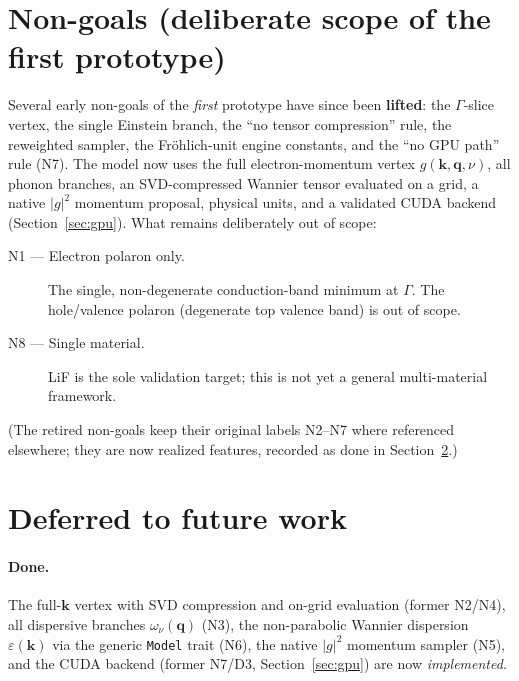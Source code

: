 \documentclass[11pt]{article}
\newcommand{\kv}{\mathbf{k}}
\newcommand{\qv}{\mathbf{q}}
\begin{document}
\section{Non-goals (deliberate scope of the first prototype)}
\label{sec:nongoals}

Several early non-goals of the \emph{first} prototype have since been \textbf{lifted}: the
$\Gamma$-slice vertex, the single Einstein branch, the ``no tensor compression'' rule, the
reweighted sampler, the Fr\"ohlich-unit engine constants, and the ``no GPU path'' rule
(N7). The model now uses the full electron-momentum vertex $g(\kv,\qv,\nu)$, all phonon
branches, an SVD-compressed Wannier tensor evaluated on a grid, a native $|g|^{2}$ momentum
proposal, physical units, and a validated CUDA backend (Section~\ref{sec:gpu}). What
remains deliberately out of scope:

\begin{description}
  \item[N1 --- Electron polaron only.] The single, non-degenerate conduction-band minimum
    at $\Gamma$. The hole/valence polaron (degenerate top valence band) is out of scope.

  \item[N8 --- Single material.] LiF is the sole validation target; this is not yet a
    general multi-material framework.
\end{description}

\noindent
(The retired non-goals keep their original labels N2--N7 where referenced elsewhere; they
are now realized features, recorded as done in Section~\ref{sec:deferred}.)

\section{Deferred to future work}
\label{sec:deferred}

\paragraph{Done.} The full-$\kv$ vertex with SVD compression and on-grid evaluation (former
N2/N4), all dispersive branches $\omega_{\nu}(\qv)$ (N3), the non-parabolic Wannier
dispersion $\varepsilon(\kv)$ via the generic \texttt{Model} trait (N6), the native
$|g|^{2}$ momentum sampler (N5), and the CUDA backend (former N7/D3,
Section~\ref{sec:gpu}) are now \emph{implemented}.
\end{document}
